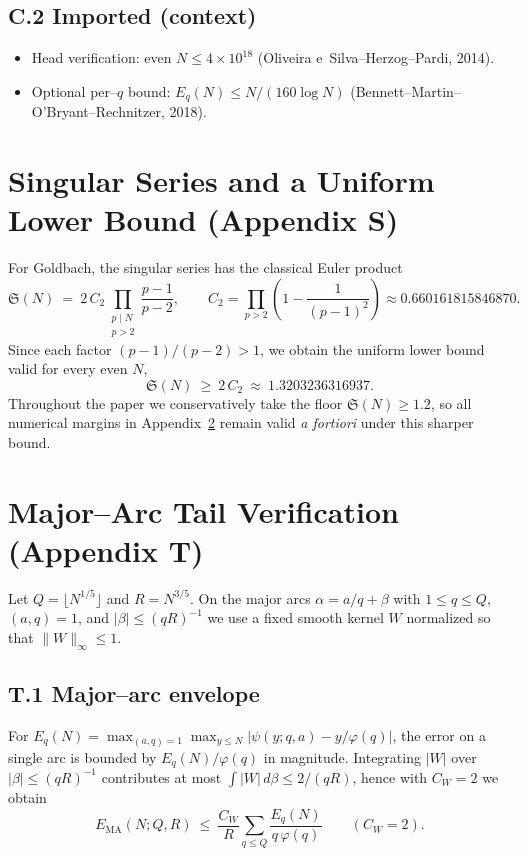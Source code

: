 \documentclass[11pt]{article}
\theoremstyle{remark}
\newcommand{\Sseries}{\mathfrak S}
\newcommand{\QQ}{\ensuremath{Q}}
\newcommand{\RR}{\ensuremath{R}}
\begin{document}
\subsection*{C.2 Imported (context)}
\begin{itemize}
  \item Head verification: even $N\le 4\times 10^{18}$ (Oliveira e~Silva--Herzog--Pardi, 2014).
  \item Optional per–$q$ bound: $E_q(N)\le N/(160\log N)$ (Bennett--Martin--O'Bryant--Rechnitzer, 2018).
\end{itemize}

\section{Singular Series and a Uniform Lower Bound (Appendix S)}\label{app:singular}
For Goldbach, the singular series has the classical Euler product
\[
\Sseries(N)\ =\ 2\,C_2 \prod_{\substack{p\mid N\\ p>2}}\frac{p-1}{p-2},
\qquad
C_2=\prod_{p>2}\left(1-\frac{1}{(p-1)^2}\right)\approx 0.660161815846870.
\]
Since each factor $(p-1)/(p-2)>1$, we obtain the uniform lower bound valid for every even $N$,
\[
\Sseries(N)\ \ge\ 2\,C_2\ \approx\ 1.3203236316937.
\]
Throughout the paper we conservatively take the floor $\Sseries(N)\ge 1.2$, so all numerical margins in Appendix~\ref{app:tail} remain valid \emph{a fortiori} under this sharper bound.

\section{Major–Arc Tail Verification (Appendix T)}\label{app:tail}
Let $\QQ=\lfloor N^{1/5}\rfloor$ and $\RR=N^{3/5}$. On the major arcs $\alpha=a/q+\beta$ with $1\le q\le \QQ$, $(a,q)=1$, and $|\beta|\le (q\RR)^{-1}$ we use a fixed smooth kernel $W$ normalized so that $\|W\|_\infty\le 1$.

\subsection*{T.1 Major–arc envelope}
For $E_q(N)=\max_{(a,q)=1}\max_{y\le N}\bigl|\psi(y;q,a)-y/\varphi(q)\bigr|$, the error on a single arc is bounded by $E_q(N)/\varphi(q)$ in magnitude. Integrating $|W|$ over $|\beta|\le (q\RR)^{-1}$ contributes at most $\int|W|\,d\beta\le 2/(q\RR)$, hence with $C_W=2$ we obtain
\[
E_{\mathrm{MA}}(N;\QQ,\RR)\ \le\ \frac{C_W}{\RR}\sum_{q\le \QQ}\frac{E_q(N)}{q\,\varphi(q)}\qquad (C_W=2).
\]
\end{document}
